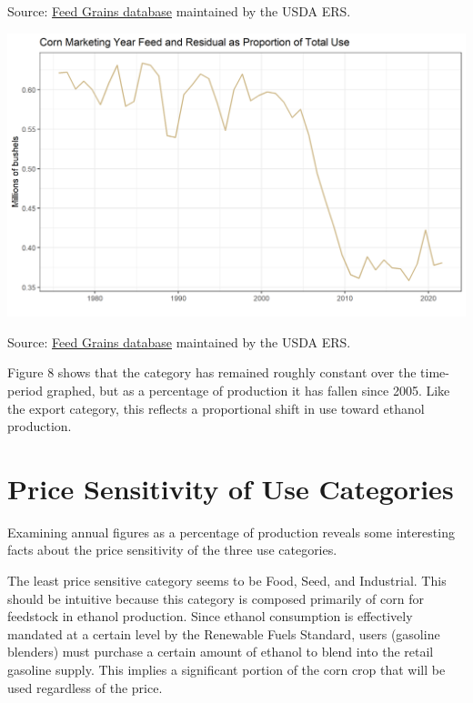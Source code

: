 \documentclass[
  letterpaper,
  DIV=11,
  numbers=noendperiod]{scrreprt}
\begin{document}
Source:
\href{http://www.ers.usda.gov/data-products/feed-grains-database/feed-grains-yearbook-tables.aspx\#26780}{Feed
Grains database} maintained by the USDA ERS.

\includegraphics{assets/ForecastingUseof-CornUseCategoriesFeedandResidPropofUse.png}

Source:
\href{http://www.ers.usda.gov/data-products/feed-grains-database/feed-grains-yearbook-tables.aspx\#26780}{Feed
Grains database} maintained by the USDA ERS.

Figure 8 shows that the category has remained roughly constant over the
time-period graphed, but as a percentage of production it has fallen
since 2005. Like the export category, this reflects a proportional shift
in use toward ethanol production.

\hypertarget{price-sensitivity-of-use-categories}{%
\section{Price Sensitivity of Use
Categories}\label{price-sensitivity-of-use-categories}}

Examining annual figures as a percentage of production reveals some
interesting facts about the price sensitivity of the three use
categories.

The least price sensitive category seems to be Food, Seed, and
Industrial. This should be intuitive because this category is composed
primarily of corn for feedstock in ethanol production. Since ethanol
consumption is effectively mandated at a certain level by the Renewable
Fuels Standard, users (gasoline blenders) must purchase a certain amount
of ethanol to blend into the retail gasoline supply. This implies a
significant portion of the corn crop that will be used regardless of the
price.
\end{document}
